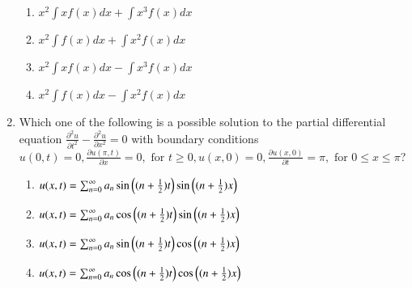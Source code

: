\documentclass[a4paper,10pt]{article}
\begin{document}
\begin{enumerate}
\begin{multicols}{2}
\begin{enumerate}
\item $x^2 \int x f(x)dx + \int x^3 f(x)dx$
\item $x^2 \int f(x)dx + \int x^2 f(x)dx$
\item $x^2 \int x f(x)dx - \int x^3 f(x)dx$
\item $x^2 \int f(x)dx - \int x^2 f(x)dx$
\end{enumerate}
\end{multicols}

\item Which one of the following is a possible solution to the partial differential equation $\frac{\partial^2 u}{\partial t^2} - \frac{\partial^2 u}{\partial x^2} = 0$ with boundary conditions $u(0,t)=0, \frac{\partial u(\pi,t)}{\partial x}=0, \text{ for } t \geq 0, u(x,0)=0, \frac{\partial u(x,0)}{\partial t}=\pi, \text{ for } 0 \leq x \leq \pi$?
\hfill{}

\begin{enumerate}
\item $u(x,t) = \sum_{n=0}^{\infty} a_n \sin\left((n+\frac{1}{2})t\right) \sin\left((n+\frac{1}{2})x\right)$
\item $u(x,t) = \sum_{n=0}^{\infty} a_n \cos\left((n+\frac{1}{2})t\right) \sin\left((n+\frac{1}{2})x\right)$
\item $u(x,t) = \sum_{n=0}^{\infty} a_n \sin\left((n+\frac{1}{2})t\right) \cos\left((n+\frac{1}{2})x\right)$
\item $u(x,t) = \sum_{n=0}^{\infty} a_n \cos\left((n+\frac{1}{2})t\right) \cos\left((n+\frac{1}{2})x\right)$
\end{enumerate}
\end{enumerate}
\end{document}
